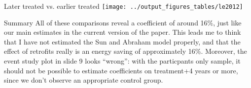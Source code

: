 \documentclass[8pt]{beamer}
\begin{document}
\begin{frame}{Later treated vs. earlier treated}
	\texttt{[image: ../output\_figures\_tables/le2012]}	
\end{frame}

\begin{frame}{Summary}
	All of these comparisons reveal a coefficient of around 16\%, just like our main estimates in the current version of the paper.  This leads me to think that I have not estimated the Sun and Abraham model properly, and that the effect of retrofits really is an energy saving of approximately 16\%. Moreover, the event study plot in slide 9 looks ``wrong'': with the particpants only sample, it should not be possible to estimate coefficients on treatment+4 years or more, since we don't observe an appropriate control group.
\end{frame}
\end{document}
